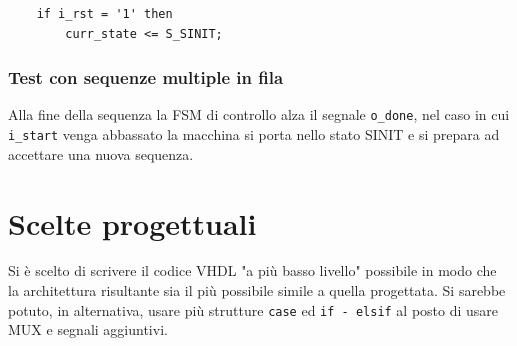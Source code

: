 \documentclass[12pt, a4paper]{article}
\begin{document}
\begin{verbatim}
    if i_rst = '1' then
        curr_state <= S_SINIT;
\end{verbatim}

\subsubsection{Test con sequenze multiple in fila}

Alla fine della sequenza la FSM di controllo alza il segnale \texttt{o\_done}, nel caso in cui \texttt{i\_start} venga abbassato
la macchina si porta nello stato SINIT e si prepara ad accettare una nuova sequenza.


\section{Scelte progettuali}

Si è scelto di scrivere il codice VHDL "a più basso livello" possibile in modo
che la architettura risultante sia il più possibile simile a quella progettata.
Si sarebbe potuto, in alternativa, usare più strutture \texttt{case} ed \texttt{if - elsif} 
al posto di usare MUX e segnali aggiuntivi.
\end{document}
